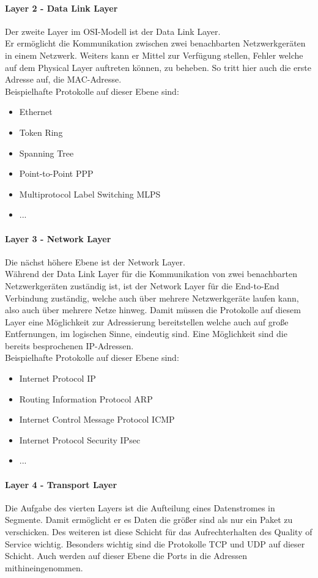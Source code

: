 \documentclass[11pt,a4paper]{report}
\begin{document}
\paragraph{Layer 2 - Data Link Layer}
Der zweite Layer im OSI-Modell ist der Data Link Layer.\\
Er ermöglicht die Kommunikation zwischen zwei benachbarten Netzwerkgeräten in einem Netzwerk. Weiters kann er Mittel zur Verfügung stellen, Fehler welche auf dem Physical Layer auftreten können, zu beheben. So tritt hier auch die erste Adresse auf, die MAC-Adresse.\\

Beispielhafte Protokolle auf dieser Ebene sind:
\begin{itemize}
\item Ethernet
\item Token Ring
\item Spanning Tree 
\item Point-to-Point PPP
\item Multiprotocol Label Switching MLPS
\item ...
\end{itemize}
\paragraph{Layer 3 - Network Layer}
Die nächst höhere Ebene ist der Network Layer.\\
Während der Data Link Layer für die Kommunikation von zwei benachbarten Netzwerkgeräten zuständig ist, ist der Network Layer für die End-to-End Verbindung zuständig, welche auch über mehrere Netzwerkgeräte laufen kann, also auch über mehrere Netze hinweg. Damit müssen die Protokolle auf diesem Layer eine Möglichkeit zur Adressierung bereitstellen welche auch auf große Entfernungen, im logischen Sinne, eindeutig sind. Eine Möglichkeit sind die bereits besprochenen IP-Adressen.\\

Beispielhafte Protokolle auf dieser Ebene sind:
\begin{itemize}
\item Internet Protocol IP
\item Routing Information Protocol ARP
\item Internet Control Message Protocol ICMP
\item Internet Protocol Security IPsec
\item ...
\end{itemize}

\paragraph{Layer 4 - Transport Layer}
Die Aufgabe des vierten Layers ist die Aufteilung eines Datenstromes in Segmente. Damit ermöglicht er es Daten die größer sind als nur ein Paket zu verschicken. Des weiteren ist diese Schicht für das Aufrechterhalten des Quality of Service wichtig. Besonders wichtig sind die Protokolle TCP und UDP auf dieser Schicht. Auch werden auf dieser Ebene die Ports in die Adressen mithineingenommen.\\
\end{document}
